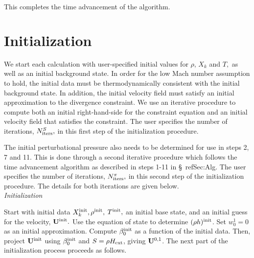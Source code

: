 \noindent This completes the time advancement of the algorithm.




\section{Initialization}\label{Sec:Initialization}

We start each calculation with user-specified initial values for
$\rho$, $X_k$ and $T,$ as well as an initial background state.  In
order for the low Mach number assumption to hold, the initial data
must be thermodynamically consistent with the initial background
state.  In addition, the initial velocity field must satisfy an
initial approximation to the divergence constraint.  We use an iterative
procedure to compute both an initial right-hand-side for the
constraint equation and an initial velocity field that satisfies
the constraint.  The user specifies the number of iterations,
$N_{\rm iters}^{S},$ in this first step of the initialization procedure.

The initial perturbational pressure also needs to be determined for
use in steps 2, 7 and 11. 
This is done through a second iterative procedure which follows the
time advancement algorithm as described in steps 1-11 in \S~ref{Sec:Alg}.  
The user specifies the number of iterations, 
$N_{\rm iters}^{\pi},$ in this second step of the initialization procedure.
The details for both iterations are given below.\\

 {\em Initialization}

Start with initial data $X_k^{\mathrm{init}}, \rho^{\mathrm{init}},$ $T^{\mathrm{init}},$ an 
initial base state, and an initial guess for the velocity, ${\bf U}^{\mathrm{init}}.$
Use the equation of state to determine $(\rho h)^{\mathrm{init}}$.  Set
$w_0^1 = 0$ as an initial approximation.  Compute $\beta_0^{\mathrm{init}}$ as a function of 
the initial data.  Then, project ${\bf U}^{\mathrm{init}}$ using $\beta_0^{\mathrm{init}}$ and 
$S = \rho{H_{\rm ext}}$, giving ${\bf U}^{0,1}$.  The next part of the initialization process 
proceeds as follows.

